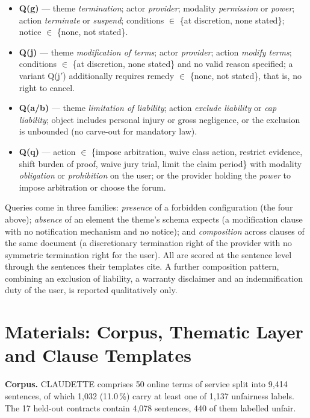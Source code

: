 \documentclass{IOS-Book-Article}
\newcommand{\corpus}{CLAUDETTE}
\begin{document}
\begin{itemize}
\item \textbf{Q(g)} --- theme \emph{termination}; actor \emph{provider}; modality \emph{permission} or \emph{power}; action \emph{terminate} or \emph{suspend}; conditions $\in$ \{at discretion, none stated\}; notice $\in$ \{none, not stated\}.
\item \textbf{Q(j)} --- theme \emph{modification of terms}; actor \emph{provider}; action \emph{modify terms}; conditions $\in$ \{at discretion, none stated\} and no valid reason specified; a variant Q(j$'$) additionally requires remedy $\in$ \{none, not stated\}, that is, no right to cancel.
\item \textbf{Q(a/b)} --- theme \emph{limitation of liability}; action \emph{exclude liability} or \emph{cap liability}; object includes personal injury or gross negligence, or the exclusion is unbounded (no carve-out for mandatory law).
\item \textbf{Q(q)} --- action $\in$ \{impose arbitration, waive class action, restrict evidence, shift burden of proof, waive jury trial, limit the claim period\} with modality \emph{obligation} or \emph{prohibition} on the user; or the provider holding the \emph{power} to impose arbitration or choose the forum.
\end{itemize}

Queries come in three families: \emph{presence} of a forbidden configuration (the four above); \emph{absence} of an element the theme's schema expects (a modification clause with no notification mechanism and no notice); and \emph{composition} across clauses of the same document (a discretionary termination right of the provider with no symmetric termination right for the user). All are scored at the sentence level through the sentences their templates cite. A further composition pattern, combining an exclusion of liability, a warranty disclaimer and an indemnification duty of the user, is reported qualitatively only.

\section{Materials: Corpus, Thematic Layer and Clause Templates}
\label{sec:materials}
\label{sec:layer}
\label{sec:templates}
\textbf{Corpus.} \corpus{} comprises 50 online terms of service split into 9,414 sentences, of which 1,032 (11.0\,\%) carry at least one of 1,137 unfairness labels. The 17 held-out contracts contain 4,078 sentences, 440 of them labelled unfair.
\end{document}
